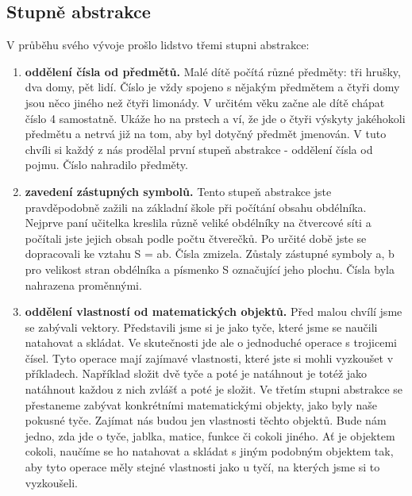     \subsection{Stupně abstrakce}
      V průběhu svého vývoje prošlo lidstvo třemi stupni abstrakce:
      \begin{enumerate}[leftmargin=1cm,rightmargin=.1cm, label=\emph{\alph*}),noitemsep]
        \item \textbf{oddělení čísla od předmětů.} Malé dítě počítá různé předměty: tři hrušky, dva
              domy, pět lidí. Číslo je vždy spojeno s nějakým předmětem a čtyři domy jsou něco
              jiného než čtyři limonády. V určitém věku začne ale dítě chápat číslo 4 samostatně.
              Ukáže ho na prstech a ví, že jde o čtyři výskyty jakéhokoli předmětu a netrvá již na
              tom, aby byl dotyčný předmět jmenován. V tuto chvíli si každý z nás prodělal první
              stupeň abstrakce - oddělení čísla od pojmu. Číslo nahradilo předměty.
        \item \textbf{zavedení zástupných symbolů.} Tento stupeň abstrakce jste pravděpodobně zažili
              na základní škole při počítání obsahu obdélníka. Nejprve paní učitelka kreslila různě
              veliké obdélníky na čtvercové síti a počítali jste jejich obsah podle počtu čtverečků.
              Po určité době jste se dopracovali ke vztahu S = ab. Čísla zmizela. Zůstaly zástupné
              symboly a, b pro velikost stran obdélníka a písmenko S označující jeho plochu. Čísla
              byla nahrazena proměnnými.
        \item \textbf{oddělení vlastností od matematických objektů.} Před malou chvílí jsme se
              zabývali vektory. Představili jsme si je jako tyče, které jsme se naučili natahovat a
              skládat. Ve skutečnosti jde ale o jednoduché operace s trojicemi čísel. Tyto operace
              mají zajímavé vlastnosti, které jste si mohli vyzkoušet v příkladech. Například
              složit dvě tyče a poté je natáhnout je totéž jako natáhnout každou z nich zvlášť a
              poté je složit. Ve třetím stupni abstrakce se přestaneme zabývat konkrétními
              matematickými objekty, jako byly naše pokusné tyče. Zajímat nás budou jen vlastnosti
              těchto objektů. Bude nám jedno, zda jde o tyče, jablka, matice, funkce či cokoli
              jiného. Ať je objektem cokoli, naučíme se ho natahovat a skládat s jiným podobným
              objektem tak, aby tyto operace měly stejné vlastnosti jako u tyčí, na kterých jsme si
              to vyzkoušeli.
      \end{enumerate} 

